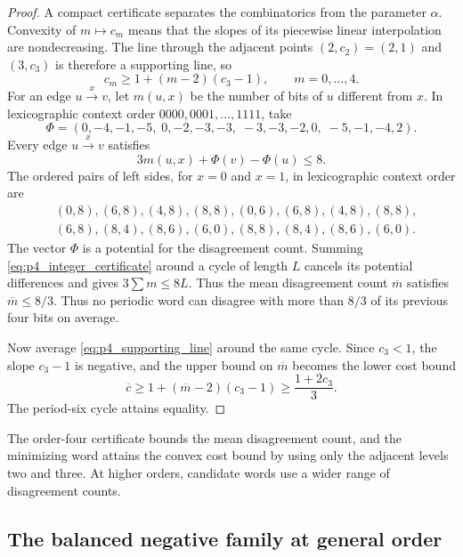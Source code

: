 \documentclass[11pt,a4paper]{article}
\begin{document}
\begin{proof}
A compact certificate separates the combinatorics from the parameter
$\alpha$.  Convexity of
$m\mapsto c_m$ means that the slopes of its piecewise linear
interpolation are nondecreasing.  The line through the adjacent points
$(2,c_2)=(2,1)$ and $(3,c_3)$ is therefore a supporting line, so
\begin{equation}
\label{eq:p4_supporting_line}
    c_m\ge1+(m-2)(c_3-1),
    \qquad m=0,\ldots,4.
\end{equation}
For an edge $u\xrightarrow{x}v$, let $m(u,x)$ be the number of bits of
$u$ different from $x$.  In lexicographic context order
$0000,0001,\ldots,1111$, take
\[
\Phi=(0,-4,-1,-5,\;0,-2,-3,-3,\;-3,-3,-2,0,\;-5,-1,-4,2).
\]
Every edge $u\xrightarrow{x}v$ satisfies
\begin{equation}
\label{eq:p4_integer_certificate}
    3m(u,x)+\Phi(v)-\Phi(u)\le8.
\end{equation}
The ordered pairs of left sides, for $x=0$ and $x=1$, in lexicographic
context order are
\[
\begin{split}
 &(0,8),(6,8),(4,8),(8,8),(0,6),(6,8),(4,8),(8,8),\\
 &(6,8),(8,4),(8,6),(6,0),(8,8),(8,4),(8,6),(6,0).
\end{split}
\]
The vector $\Phi$ is a potential for the disagreement count.  Summing
\eqref{eq:p4_integer_certificate} around a cycle of length $L$ cancels
its potential differences and gives $3\sum m\le8L$.  Thus the mean
disagreement count $\overline m$ satisfies $\overline m\le8/3$.  Thus no periodic word can disagree with more
than $8/3$ of its previous four bits on average.

Now average \eqref{eq:p4_supporting_line} around the same cycle.
Since $c_3<1$, the slope $c_3-1$ is negative, and the upper bound on
$\overline m$ becomes the lower cost bound
\[
    \overline c
    \ge1+(\overline m-2)(c_3-1)
    \ge\frac{1+2c_3}{3}.
\]
The period-six cycle attains equality.
\end{proof}

The order-four certificate bounds the mean disagreement count,
and the minimizing word attains the convex cost bound by using only
the adjacent levels two and three.  At higher orders, candidate
words use a wider range of disagreement counts.

\subsection{The balanced negative family at general order}
\label{subsec:two_run}
\end{document}
